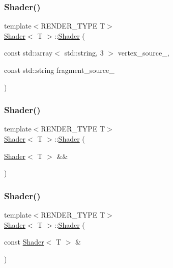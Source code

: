 \subsubsection{\texorpdfstring{Shader()}{Shader()}\hspace{0.1cm}{\footnotesize\ttfamily [2/8]}}
{\footnotesize\ttfamily template$<$R\+E\+N\+D\+E\+R\+\_\+\+T\+Y\+PE T$>$ \\
\mbox{\hyperlink{classShader}{Shader}}$<$ T $>$\+::\mbox{\hyperlink{classShader}{Shader}} (\begin{DoxyParamCaption}\item[{const std\+::array$<$ std\+::string, 3 $>$}]{vertex\+\_\+source\+\_\+,  }\item[{const std\+::string}]{fragment\+\_\+source\+\_\+ }\end{DoxyParamCaption})\hspace{0.3cm}{\ttfamily [inline]}}

\mbox{\label{classShader_a7e30078f161d1c9f48a7b3921c01f816}} 
\subsubsection{\texorpdfstring{Shader()}{Shader()}\hspace{0.1cm}{\footnotesize\ttfamily [3/8]}}
{\footnotesize\ttfamily template$<$R\+E\+N\+D\+E\+R\+\_\+\+T\+Y\+PE T$>$ \\
\mbox{\hyperlink{classShader}{Shader}}$<$ T $>$\+::\mbox{\hyperlink{classShader}{Shader}} (\begin{DoxyParamCaption}\item[{\mbox{\hyperlink{classShader}{Shader}}$<$ T $>$ \&\&}]{ }\end{DoxyParamCaption})\hspace{0.3cm}{\ttfamily [delete]}}

\mbox{\label{classShader_a49b2a448a00b5e1413c17501f8873cca}} 
\subsubsection{\texorpdfstring{Shader()}{Shader()}\hspace{0.1cm}{\footnotesize\ttfamily [4/8]}}
{\footnotesize\ttfamily template$<$R\+E\+N\+D\+E\+R\+\_\+\+T\+Y\+PE T$>$ \\
\mbox{\hyperlink{classShader}{Shader}}$<$ T $>$\+::\mbox{\hyperlink{classShader}{Shader}} (\begin{DoxyParamCaption}\item[{const \mbox{\hyperlink{classShader}{Shader}}$<$ T $>$ \&}]{ }\end{DoxyParamCaption})\hspace{0.3cm}{\ttfamily [delete]}}

